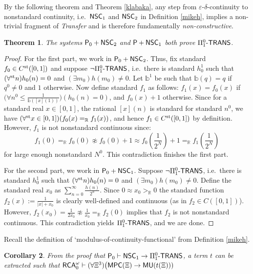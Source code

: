 \documentclass[reqno]{amsart}
\newtheorem{thm}{Theorem}
\newtheorem{cor}[thm]{Corollary}
\def\RCAo{\textup{\textsf{RCA}}_{0}^{\omega}}
\def\P{\textup{\textsf{P}}}
\def\R{{\mathbb  R}}
\def\R{{\mathbb{R}}}
\def\st{\textup{st}}
\def\di{\rightarrow}
\def\eps{\varepsilon}
\def\paai{\Pi_{1}^{0}\textup{-\textsf{TRANS}}}
\def\MPC{\textup{\textsf{MPC}}}
\def\NSC{\textup{\textsf{NSC}}}
\def\MU{\textup{\textsf{MU}}}
\numberwithin{equation}{section}
\numberwithin{thm}{section}
\begin{document}
By the following theorem and Theorem \ref{klabaka}, any step from $\eps$-$\delta$-continuity to nonstandard continuity, i.e.\ $\NSC_{1}$ and $\NSC_{2}$ in Definition \ref{mikeh}, implies a non-trivial fragment of \emph{Transfer} and is therefore fundamentally \emph{non-constructive}.  %
\begin{thm}\label{hark2} 
The systems $\P_{0}+\NSC_{2}$ and $\P+\NSC_{1}$ both prove $\paai$.  
\end{thm}
\begin{proof}
For the first part, we work in $\P_{0}+\NSC_{2}$.  Thus, fix standard $f_{0}\in C^{\st}([0,1])$ and suppose $\neg\paai$, i.e.\ there is standard $h_{0}^{1}$ such that $(\forall^{\st}n)h_{0}(n)=0$ and $(\exists m_{0})h(m_{0})\ne0$.  Let $\mathbb{b}^{1}$ be such that $\mathbb{b}(q)=q$ if $q^{0}\ne 0$ and $1$ otherwise.  
Now define standard $f_{1}$ as follows: $f_{1}(x)=f_{0}(x)$ if $\big(\forall n^{0}\leq \frac{1}{\mathbb{b}([x](1))}\big)(h_{0}(n)=0)$, and $f_{0}(x)+1$ otherwise.  
Since for a standard real $x\in[0,1]$, the rational $[x](n)$ is standard for standard $n^{0}$, we have $(\forall^{\st}x\in [0,1])(f_{0}(x)=_{\R}f_{1}(x))$, and hence $f_{1}\in C^{\st}([0,1])$ by definition.  
However, $f_{1}$ is not nonstandard continuous since:
\[\textstyle
f_{1}(0)=_{\R}f_{0}(0)\not\approx f_{0}(0)+1\approx f_{0}(\frac{1}{2^{N}})+1=_{\R}f_{1}(\frac{1}{2^{N}})
\]
for large enough nonstandard $N^{0}$.  This contradiction finishes the first part.

\medskip

For the second part, we work in $\P_{0}+\NSC_{1}$.  Suppose $\neg\paai$, i.e.\ there is standard $h_{0}^{1}$ such that $(\forall^{\st}n)h_{0}(n)=0$ and $(\exists m_{0})h(m_{0})\ne0$.  
Define the standard real $x_{0}$ as $\sum_{n=0}^{\infty}\frac{h(n)}{2^{n}}$.  Since $0\approx x_{0}>_{\R}0$ the standard function $f_{2}(x):=\frac{1}{|x|+x_{0}}$ is clearly well-defined and continuous (as in $f_{2}\in C([0,1])$).  However, $f_{2}(x_{0})=\frac{1}{2x_{0}}\not\approx \frac{1}{x_{0}}=_{\R} f_{2}(0)$ implies that $f_{2}$ is not nonstandard continuous.  This contradiction yields $\paai$, and we are done.        
\end{proof}
Recall the definition of `modulus-of-continuity-functional' from Definition \ref{mikeh}. 
\begin{cor}\label{idare}
From the proof that $\P_{0}\vdash \NSC_{1}\di \paai$, a term $t$ can be extracted such that $\RCAo\vdash (\forall \Xi^{3})\big(\MPC(\Xi)\di \MU(t(\Xi)))$
\end{cor}
\end{document}
